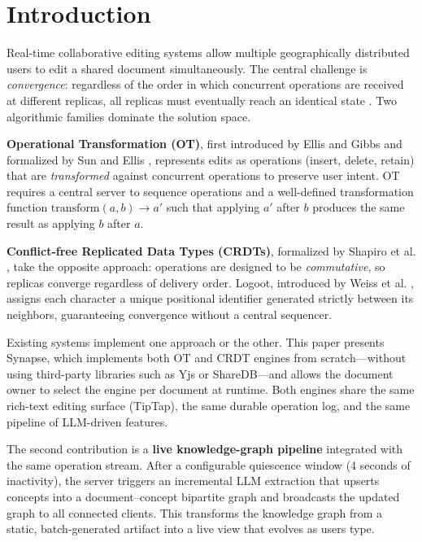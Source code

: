 \documentclass[conference]{IEEEtran}
\begin{document}
\section{Introduction}

Real-time collaborative editing systems allow multiple geographically distributed users to edit a shared document simultaneously. The central challenge is \emph{convergence}: regardless of the order in which concurrent operations are received at different replicas, all replicas must eventually reach an identical state \cite{ellis1989}. Two algorithmic families dominate the solution space.

\textbf{Operational Transformation (OT)}, first introduced by Ellis and Gibbs \cite{ellis1989} and formalized by Sun and Ellis \cite{sun1998}, represents edits as operations (insert, delete, retain) that are \emph{transformed} against concurrent operations to preserve user intent. OT requires a central server to sequence operations and a well-defined transformation function $\text{transform}(a, b) \rightarrow a'$ such that applying $a'$ after $b$ produces the same result as applying $b$ after $a$.

\textbf{Conflict-free Replicated Data Types (CRDTs)}, formalized by Shapiro et al. \cite{shapiro2011,shapiro2011b}, take the opposite approach: operations are designed to be \emph{commutative}, so replicas converge regardless of delivery order. Logoot, introduced by Weiss et al. \cite{weiss2009}, assigns each character a unique positional identifier generated strictly between its neighbors, guaranteeing convergence without a central sequencer.

Existing systems implement one approach or the other. This paper presents Synapse, which implements both OT and CRDT engines from scratch---without using third-party libraries such as Yjs or ShareDB---and allows the document owner to select the engine per document at runtime. Both engines share the same rich-text editing surface (TipTap), the same durable operation log, and the same pipeline of LLM-driven features.

The second contribution is a \textbf{live knowledge-graph pipeline} integrated with the same operation stream. After a configurable quiescence window (4 seconds of inactivity), the server triggers an incremental LLM extraction that upserts concepts into a document--concept bipartite graph and broadcasts the updated graph to all connected clients. This transforms the knowledge graph from a static, batch-generated artifact into a live view that evolves as users type.
\end{document}
